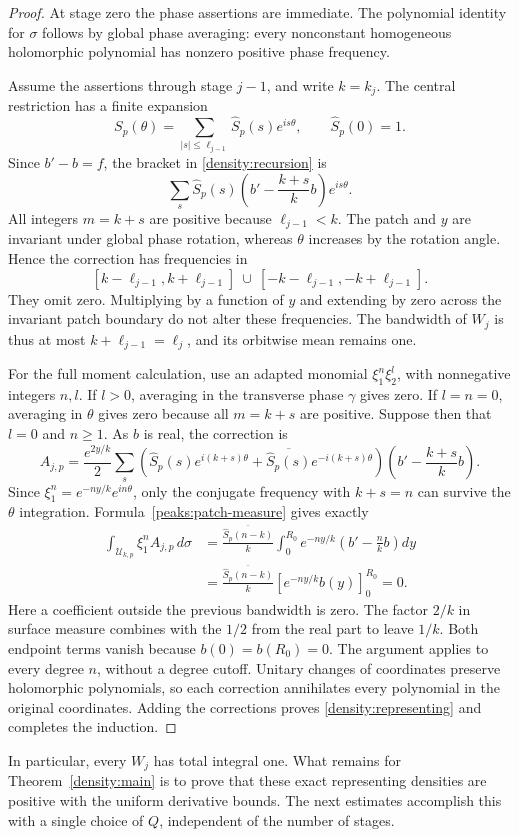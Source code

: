 \begin{proof}
At stage zero the phase assertions are immediate.  The polynomial
identity for $\sigma$ follows by global phase averaging: every
nonconstant homogeneous holomorphic polynomial has nonzero
positive phase frequency.

Assume the assertions through stage $j-1$, and write $k=k_j$.
The central restriction has a finite expansion
\[
 S_p(\theta)=\sum_{|s|\le\ell_{j-1}}\widehat S_p(s) e^{is\theta},
 \qquad \widehat S_p(0)=1.
\]
Since $b'-b=f$, the bracket in \eqref{density:recursion} is
\[
 \sum_s \widehat S_p(s)\left(b'-\frac{k+s}{k}b\right)e^{is\theta}.
\]
All integers $m=k+s$ are positive because $\ell_{j-1}<k$.
The patch and $y$ are invariant under global phase rotation,
whereas $\theta$ increases by the rotation angle.  Hence the
correction has frequencies in
\begin{equation}\label{density:bandwidth}
 [k-\ell_{j-1},k+\ell_{j-1}]
 \ \cup\ [-k-\ell_{j-1},-k+\ell_{j-1}].
\end{equation}
They omit zero.  Multiplying by a function of $y$ and extending
by zero across the invariant patch boundary do not alter these
frequencies.  The bandwidth of $W_j$ is thus at most
$k+\ell_{j-1}=\ell_j$, and its orbitwise mean remains one.

For the full moment calculation, use an adapted monomial
$\xi_1^n\xi_2^l$, with nonnegative integers $n,l$.  If $l>0$,
averaging in the transverse phase $\gamma$ gives zero.  If
$l=n=0$, averaging in $\theta$ gives zero because all $m=k+s$
are positive.  Suppose then that $l=0$ and $n\ge1$.  As $b$ is
real, the correction is
\[
 A_{j,p}=\frac{e^{2y/k}}2
 \sum_s\left(\widehat S_p(s) e^{i(k+s)\theta}
              +\overline{\widehat S_p(s)}e^{-i(k+s)\theta}\right)
       \left(b'-\frac{k+s}{k}b\right).
\]
Since $\xi_1^n=e^{-ny/k}e^{in\theta}$, only the conjugate
frequency with $k+s=n$ can survive the $\theta$ integration.
Formula~\eqref{peaks:patch-measure} gives exactly
\[
 \begin{split}
 \int_{\mathcal U_{k,p}}\xi_1^n A_{j,p}\,d\sigma
 &=\frac{\overline{\widehat S_p(n-k)}}{k}
   \int_0^{R_0}e^{-ny/k}\left(b'-\frac nk b\right)dy\\
 &=\frac{\overline{\widehat S_p(n-k)}}{k}
   \left[e^{-ny/k}b(y)\right]_0^{R_0}=0.
 \end{split}
\]
Here a coefficient outside the previous bandwidth is zero.  The
factor $2/k$ in surface measure combines with the $1/2$ from the
real part to leave $1/k$.  Both endpoint terms vanish because
$b(0)=b(R_0)=0$.
The argument applies to every degree $n$, without a degree cutoff.
Unitary changes of coordinates preserve holomorphic polynomials,
so each correction annihilates every polynomial in the original
coordinates.  Adding the corrections proves
\eqref{density:representing} and completes the induction.
\end{proof}

In particular, every $W_j$ has total integral one.  What remains
for Theorem~\ref{density:main} is to prove that these exact
representing densities are positive with the uniform derivative
bounds.  The next estimates accomplish this with a single choice
of $Q$, independent of the number of stages.
